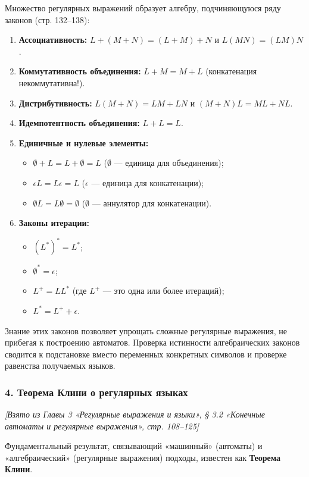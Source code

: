 \documentclass[a4paper,12pt]{article}
\begin{document}
Множество регулярных выражений образует алгебру, подчиняющуюся ряду законов (стр. 132–138):
\begin{enumerate}
    \item \textbf{Ассоциативность:} \(L + (M + N) = (L + M) + N\) и \(L(MN) = (LM)N\).
    \item \textbf{Коммутативность объединения:} \(L + M = M + L\) (конкатенация некоммутативна!).
    \item \textbf{Дистрибутивность:} \(L(M + N) = LM + LN\) и \((M + N)L = ML + NL\).
    \item \textbf{Идемпотентность объединения:} \(L + L = L\).
    \item \textbf{Единичные и нулевые элементы:} 
    \begin{itemize}
        \item \(\emptyset + L = L + \emptyset = L\) (\(\emptyset\) — единица для объединения);
        \item \(\epsilon L = L \epsilon = L\) (\(\epsilon\) — единица для конкатенации);
        \item \(\emptyset L = L \emptyset = \emptyset\) (\(\emptyset\) — аннулятор для конкатенации).
    \end{itemize}
    \item \textbf{Законы итерации:} 
    \begin{itemize}
        \item \((L^*)^* = L^*\);
        \item \(\emptyset^* = \epsilon\);
        \item \(L^+ = L L^*\) (где \(L^+\) — это одна или более итераций);
        \item \(L^* = L^+ + \epsilon\).
    \end{itemize}
\end{enumerate}
Знание этих законов позволяет упрощать сложные регулярные выражения, не прибегая к построению автоматов. Проверка истинности алгебраических законов сводится к подстановке вместо переменных конкретных символов и проверке равенства получаемых языков.

\subsubsection*{4. Теорема Клини о регулярных языках}
\textit{[Взято из Главы 3 «Регулярные выражения и языки», § 3.2 «Конечные автоматы и регулярные выражения», стр. 108–125]}

Фундаментальный результат, связывающий «машинный» (автоматы) и «алгебраический» (регулярные выражения) подходы, известен как \textbf{Теорема Клини}. 
\end{document}
